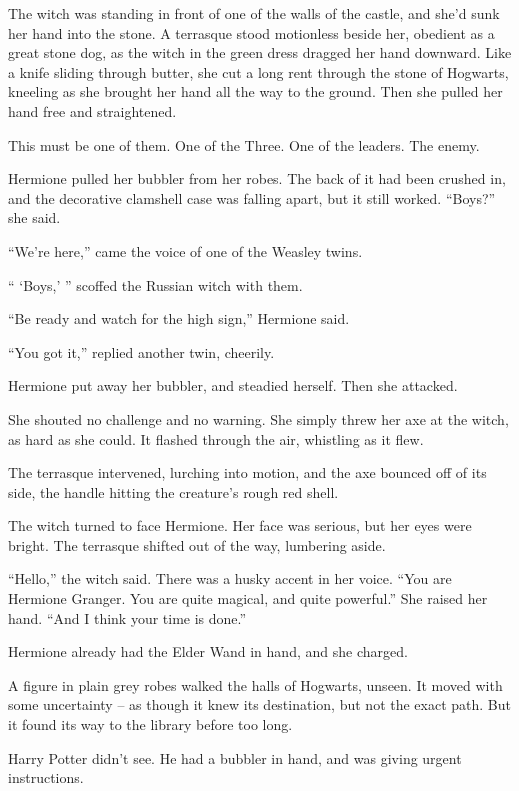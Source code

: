 The witch was standing in front of one of the walls of the castle, and
she'd sunk her hand into the stone. A terrasque stood motionless beside
her, obedient as a great stone dog, as the witch in the green dress
dragged her hand downward. Like a knife sliding through butter, she cut
a long rent through the stone of Hogwarts, kneeling as she brought her
hand all the way to the ground. Then she pulled her hand free and
straightened.

This must be one of them. One of the Three. One of the leaders. The
enemy.

Hermione pulled her bubbler from her robes. The back of it had been
crushed in, and the decorative clamshell case was falling apart, but it
still worked. ``Boys?'' she said.

``We're here,'' came the voice of one of the Weasley twins.

`` `Boys,' '' scoffed the Russian witch with them.

``Be ready and watch for the high sign,'' Hermione said.

``You got it,'' replied another twin, cheerily.

Hermione put away her bubbler, and steadied herself. Then she attacked.

She shouted no challenge and no warning. She simply threw her axe at the
witch, as hard as she could. It flashed through the air, whistling as it
flew.

The terrasque intervened, lurching into motion, and the axe bounced off
of its side, the handle hitting the creature's rough red shell.

The witch turned to face Hermione. Her face was serious, but her eyes
were bright. The terrasque shifted out of the way, lumbering aside.

``Hello,'' the witch said. There was a husky accent in her voice. ``You
are Hermione Granger. You are quite magical, and quite powerful.'' She
raised her hand. ``And I think your time is done.''

Hermione already had the Elder Wand in hand, and she charged.

\mybreak

A figure in plain grey robes walked the halls of Hogwarts, unseen. It
moved with some uncertainty -- as though it knew its destination, but
not the exact path. But it found its way to the library before too long.

Harry Potter didn't see. He had a bubbler in hand, and was giving urgent
instructions.

